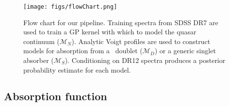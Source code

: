 \documentclass[fleqn,usenatbib]{mnras}
\newcommand{\civ}{\ion{C}{IV}}
\newcommand{\model}{\mathcal{M}}
\begin{document}
\begin{figure}
  \centering
  \texttt{[image: figs/flowChart.png]}
  \caption{Flow chart for our pipeline. Training spectra from SDSS DR7 are used to train a GP kernel with which to model the quasar continuum ($\model_{N}$). Analytic Voigt profiles are used to construct models for absorption from a \civ\ doublet ($\model_D$) or a generic singlet absorber ($\model_S$). Conditioning on DR12 spectra produces a posterior probability estimate for each model.}
  \label{fig:flowChart}

\end{figure}

\subsection{Absorption function}
\label{sec:absorption}
\end{document}
